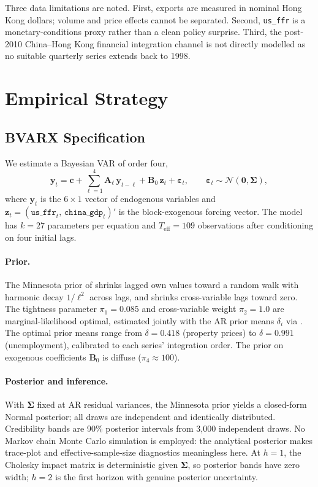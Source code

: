 \documentclass[12pt,a4paper]{article}
\begin{document}
Three data limitations are noted. First, exports are measured in nominal Hong Kong
dollars; volume and price effects cannot be separated. Second, \texttt{us\_ffr}
is a monetary-conditions proxy rather than a clean policy surprise. Third, the
post-2010 China--Hong Kong financial integration channel is not directly modelled
as no suitable quarterly series extends back to 1998.

\section{Empirical Strategy}
\label{sec:strategy}

\subsection{BVARX Specification}

We estimate a Bayesian VAR of order four,
\begin{equation}
  \mathbf{y}_t = \mathbf{c} + \sum_{\ell=1}^{4} \mathbf{A}_\ell\, \mathbf{y}_{t-\ell}
               + \mathbf{B}_0\, \mathbf{z}_t + \boldsymbol{\varepsilon}_t,
  \qquad \boldsymbol{\varepsilon}_t \sim \mathcal{N}(\mathbf{0}, \boldsymbol{\Sigma}),
\label{eq:bvar}
\end{equation}
where $\mathbf{y}_t$ is the $6 \times 1$ vector of endogenous variables and
$\mathbf{z}_t = (\texttt{us\_ffr}_t,\, \texttt{china\_gdp}_t)'$ is the
block-exogenous forcing vector. The model has $k = 27$ parameters per equation
and $T_{\mathrm{eff}} = 109$ observations after conditioning on four initial lags.

\paragraph{Prior.}
The Minnesota prior of \citet{Litterman1986} shrinks lagged own values toward
a random walk with harmonic decay $1/\ell^2$ across lags, and shrinks
cross-variable lags toward zero. The tightness parameter $\pi_1 = 0.085$
and cross-variable weight $\pi_2 = 1.0$ are marginal-likelihood optimal,
estimated jointly with the AR prior means $\delta_i$ via \citet{GiannoneEtAl2015}.
The optimal prior means range from $\delta = 0.418$ (property prices) to
$\delta = 0.991$ (unemployment), calibrated to each series' integration order.
The prior on exogenous coefficients $\mathbf{B}_0$ is diffuse ($\pi_4 \approx 100$).

\paragraph{Posterior and inference.}
With $\boldsymbol{\Sigma}$ fixed at AR residual variances, the Minnesota prior
yields a closed-form Normal posterior; all draws are independent and identically
distributed. Credibility bands are 90\% posterior intervals from 3,000 independent
draws. No Markov chain Monte Carlo simulation is employed: the analytical posterior
makes trace-plot and effective-sample-size diagnostics meaningless here. At
$h = 1$, the Cholesky impact matrix is deterministic given $\boldsymbol{\Sigma}$,
so posterior bands have zero width; $h = 2$ is the first horizon with genuine
posterior uncertainty.
\end{document}
